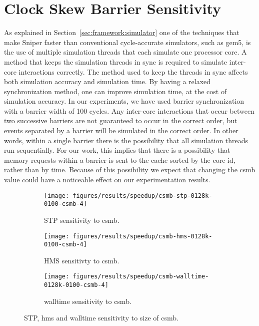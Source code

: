 \section{Clock Skew Barrier Sensitivity}
\label{sec:results:csmb_sensitivity}

As explained in Section~\ref{sec:framework:simulator} one of the techniques that make Sniper faster than conventional cycle-accurate simulators, such as gem5, is the use of multiple simulation threads that each simulate one processor core.
A method that keeps the simulation threads in sync is required to simulate inter-core interactions correctly.
The method used to keep the threads in sync affects both simulation accuracy and simulation time.
By having a relaxed synchronization method, one can improve simulation time, at the cost of simulation accuracy.
In our experiments, we have used barrier synchronization with a barrier width of 100 cycles.
Any inter-core interactions that occur between two successive barriers are not guaranteed to occur in the correct order, but events separated by a barrier will be simulated in the correct order.
In other words, within a single barrier there is the possibility that all simulation threads run sequentially.
For our work, this implies that there is a possibility that memory requests within a barrier is sent to the cache sorted by the core id, rather than by time.
Because of this possibility we expect that changing the \gls{csmb} value could have a noticeable effect on our experimentation results.

\begin{figure}[th]
    \centering
    \begin{subfigure}[b]{0.5\textwidth}
        \texttt{[image: figures/results/speedup/csmb-stp-0128k-0100-csmb-4]}
        \caption{STP sensitivity to \gls{csmb}.}
        \label{fig:results:csmb:stp}
    \end{subfigure}%
    \begin{subfigure}[b]{0.5\textwidth}
        \texttt{[image: figures/results/speedup/csmb-hms-0128k-0100-csmb-4]}
        \caption{HMS sensitivty to \gls{csmb}.}
        \label{fig:results:csmb:hms}
    \end{subfigure}
    \begin{subfigure}[b]{0.6\textwidth}
        \texttt{[image: figures/results/speedup/csmb-walltime-0128k-0100-csmb-4]}
        \caption{walltime sensitivity to \gls{csmb}.}
        \label{fig:results:csmb:walltime}
    \end{subfigure}
    \caption{STP, \gls{hms} and walltime sensitivity to size of \gls{csmb}.}
    \label{fig:results:csmb}
\end{figure}


